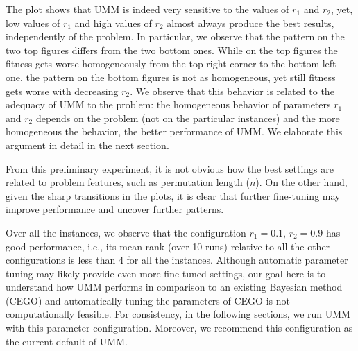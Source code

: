 \documentclass[sigconf,dvipsnames]{acmart}
\begin{document}
The plot shows that UMM is indeed very sensitive to the values of $r_1$ and
$r_2$, yet, low values of $r_1$ and high values of $r_2$ almost always produce
the best results, independently of the problem.  In particular, we observe that
the pattern on the two top figures differs from the two bottom ones. While on
the top figures the fitness gets worse homogeneously from the top-right corner
to the bottom-left one, the pattern on the bottom figures is not as homogeneous, yet
still fitness gets worse with decreasing $r_2$.  We observe that this behavior
is related to the adequacy of UMM to the problem: the homogeneous behavior of
parameters $r_1$ and $r_2$ depends on the problem (not on the particular
instances) and the more homogeneous the behavior, the better performance of
UMM. We elaborate this argument in detail in the next section.

From this preliminary experiment, it is not obvious how the best settings are
related to problem features, such as permutation length ($n$). On the other
hand, given the sharp transitions in the plots, it is clear that further
fine-tuning may improve performance and uncover further patterns.

Over all the instances, we observe that the configuration $r_1 =0.1$, $r_2=0.9$
has good performance, i.e., its mean rank (over 10 runs) relative to all the
other configurations is less than 4 for all the instances.  Although automatic
parameter tuning may likely provide even more fine-tuned settings, our goal
here is to understand how UMM performs in comparison to an existing Bayesian
method (CEGO) and automatically tuning the parameters of CEGO is not
computationally feasible.  For consistency, in the following sections, we run
UMM with this parameter configuration.  Moreover, we recommend this
configuration as the current default of UMM.
\end{document}

